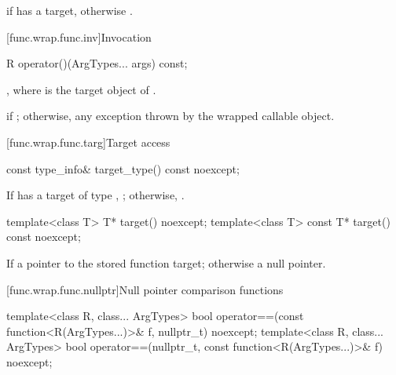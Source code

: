 \begin{itemdescr}
\pnum
\returns {} if  has a target, otherwise .
\end{itemdescr}

[func.wrap.func.inv]{Invocation}

%
%
\begin{itemdecl}
R operator()(ArgTypes... args) const;
\end{itemdecl}

\begin{itemdescr}
\pnum
\returns {},
where  is the target object of .

\pnum\throws
{} if ; otherwise, any
exception thrown by the wrapped callable object.
\end{itemdescr}

[func.wrap.func.targ]{Target access}

%
\begin{itemdecl}
const type_info& target_type() const noexcept;
\end{itemdecl}

\begin{itemdescr}
\pnum\returns If  has a target of type ,
  ; otherwise, .
\end{itemdescr}

%
\begin{itemdecl}
template<class T>       T* target() noexcept;
template<class T> const T* target() const noexcept;
\end{itemdecl}

\begin{itemdescr}
\pnum\returns If 
a pointer to the stored function target; otherwise a null pointer.
\end{itemdescr}

[func.wrap.func.nullptr]{Null pointer comparison functions}

%
\begin{itemdecl}
template<class R, class... ArgTypes>
  bool operator==(const function<R(ArgTypes...)>& f, nullptr_t) noexcept;
template<class R, class... ArgTypes>
  bool operator==(nullptr_t, const function<R(ArgTypes...)>& f) noexcept;
\end{itemdecl}

